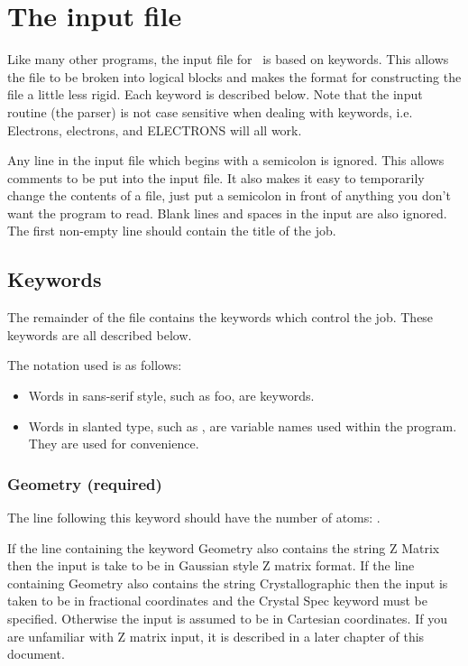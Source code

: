\chapter{The input file}

Like many other programs, the input file for \calcprog\ is based on
keywords.  This allows the file to be broken into logical 
blocks and makes the format for constructing the file a little
less rigid.  Each keyword is described below.  Note that the input
routine (the parser) is
not case sensitive when dealing with keywords, i.e. Electrons,
electrons, and ELECTRONS will all work.

Any line in the input file which begins with a semicolon is ignored.
This allows comments to be put into the input file. It also makes it
easy to temporarily change the contents of a file, just put a
semicolon in front of anything you don't want the program to read.
Blank lines and spaces in the input are also ignored. \\[0.1in]

\noindent The first non-empty line should contain the title of the job.


\section{Keywords}
The remainder of the file contains the keywords which control the job.
These keywords are all described below.

The notation used is as follows:  

\begin{itemize}

\item Words in sans-serif style, such as {\sf foo,} are keywords.

\item Words in slanted type, such as , are
variable names used within the program.  They are used for convenience.

\end{itemize}


\subsection{{\sf Geometry} (required)}

The line following this keyword should have the number of atoms:
. 

If the line containing the keyword {\sf Geometry} also contains the
string {\sf Z Matrix} then the input is take to be in Gaussian style Z
matrix format.  If the line containing {\sf Geometry} also contains
the string {\sf Crystallographic} then the input is taken to be in
fractional coordinates and the {\sf Crystal Spec} keyword must be
specified.  Otherwise the input is assumed to be in Cartesian
coordinates.  If you are unfamiliar with Z matrix input, it is
described in a later chapter of this document.

